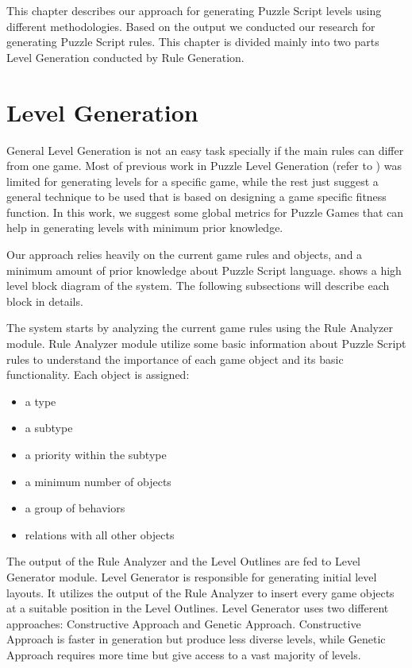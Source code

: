 This chapter describes our approach for generating Puzzle Script levels using different methodologies. Based on the output we conducted our research for generating Puzzle Script rules. This chapter is divided mainly into two parts Level Generation conducted by Rule Generation.

\section{Level Generation}
General Level Generation is not an easy task specially if the main rules can differ from one game. Most of previous work in Puzzle Level Generation (refer to ) was limited for generating levels for a specific game, while the rest just suggest a general technique to be used that is based on designing a game specific fitness function. In this work, we suggest some global metrics for Puzzle Games that can help in generating levels with minimum prior knowledge.\\\par

Our approach relies heavily on the current game rules and objects, and a minimum amount of prior knowledge about Puzzle Script language.  shows a high level block diagram of the system. The following subsections will describe each block in details.


The system starts by analyzing the current game rules using the Rule Analyzer module. Rule Analyzer module utilize some basic information about Puzzle Script rules to understand the importance of each game object and its basic functionality. Each object is assigned:
\begin{itemize} \itemsep0pt \parskip0pt 
	\item a type
	\item a subtype
	\item a priority within the subtype
	\item a minimum number of objects
	\item a group of behaviors
	\item relations with all other objects
\end{itemize}

The output of the Rule Analyzer and the Level Outlines are fed to Level Generator module. Level Generator is responsible for generating initial level layouts. It utilizes the output of the Rule Analyzer to insert every game objects at a suitable position in the Level Outlines. Level Generator uses two different approaches: Constructive Approach and Genetic Approach. Constructive Approach is faster in generation but produce less diverse levels, while Genetic Approach requires more time but give access to a vast majority of levels.\\\par

